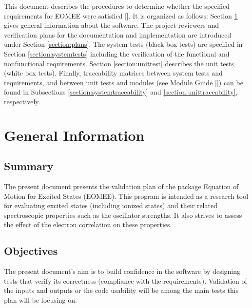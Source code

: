 \documentclass[12pt, titlepage]{article}
\begin{document}
\newpage


This document describes the procedures to determine whether the specified 
requirements for EOMEE were satisfied [\cite{SRS2020}]. It is organized as 
follows: Section \ref{section:geninfo} gives general information about the 
software. The project reviewers and verification plans for the documentation 
and implementation are introduced under Section \ref{section:plans}. The system 
tests (black box tests) are specified in Section \ref{section:systemtests} 
including the verification of the functional and nonfunctional requirements. 
Section \ref{section:unittest} describes the unit tests (white box tests). 
Finally, traceability matrices between system tests and requirements, and 
between unit tests and modules (see Module Guide [\cite{MG2020}]) can be found 
in Subsections \ref{section:systemtraceability} and 
\ref{section:unittraceability}, respectively.

\section{General Information}
\label{section:geninfo}

\subsection{Summary}

The present document presents the validation plan of the package Equation of 
Motion for Excited States (EOMEE). This program is intended as a research tool 
for evaluating excited states (including ionized states) and their related 
spectroscopic properties such as the oscillator strengths. It also strives to 
assess the effect of the electron correlation on these properties.

\subsection{Objectives}

The present document's aim is to build confidence in the software by designing 
tests that verify its correctness (compliance with the requirements). 
Validation of the inputs and outputs or the 
code usability will be among the main tests this plan will be focusing on.
\end{document}
